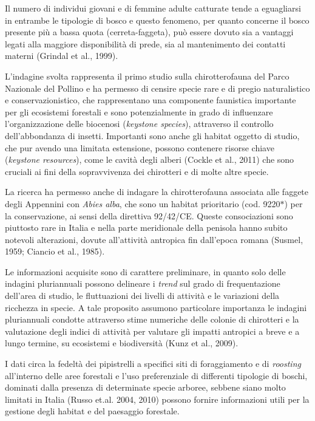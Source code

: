 \begin{multicols}{2}
Il numero di individui giovani e di femmine adulte catturate tende a eguagliarsi in entrambe le tipologie di bosco e questo fenomeno, per quanto concerne il bosco presente più a bassa quota (cerreta-faggeta), può essere dovuto sia a vantaggi legati alla maggiore disponibilità di prede, sia al mantenimento dei contatti materni (Grindal et al., 1999).

L’indagine svolta rappresenta il primo studio sulla chirotterofauna del Parco Nazionale del Pollino e ha permesso di censire specie rare e di pregio naturalistico e conservazionistico, che rappresentano una componente faunistica importante per gli ecosistemi forestali e sono potenzialmente in grado di influenzare l’organizzazione delle biocenosi (\textit{keystone species}), attraverso il controllo dell’abbondanza di insetti. Importanti sono anche gli habitat oggetto di studio, che pur avendo una limitata estensione, possono contenere risorse chiave (\textit{keystone resources}), come le cavità degli alberi (Cockle et al., 2011) che sono cruciali ai fini della sopravvivenza dei chirotteri e di molte altre specie. 

La ricerca ha permesso anche di indagare la chirotterofauna associata alle faggete degli Appennini con \emph{Abies alba}, che sono un habitat prioritario (cod. 9220$\ast$) per la conservazione, ai sensi della direttiva 92/42/CE. Queste consociazioni sono piuttosto rare in Italia e nella parte meridionale della penisola hanno subito notevoli alterazioni, dovute all’attività antropica fin dall’epoca romana (Susmel, 1959; Ciancio et al., 1985).    

Le informazioni acquisite sono di carattere preliminare, in quanto solo delle indagini pluriannuali possono delineare i \textit{trend} sul grado di frequentazione dell’area di studio, le fluttuazioni dei livelli di attività e le variazioni della ricchezza in specie. A tale proposito assumono particolare importanza le indagini pluriannuali condotte attraverso stime numeriche delle colonie di chirotteri e la valutazione degli indici di attività per valutare gli impatti antropici a breve e a lungo termine, su ecosistemi e biodiversità (Kunz et al., 2009).

I dati circa la fedeltà dei pipistrelli a specifici siti di foraggiamento e di \textit{roosting} all’interno delle aree forestali e l’uso preferenziale di differenti tipologie di boschi, dominati dalla presenza di determinate specie arboree, sebbene siano molto limitati in Italia (Russo et.al. 2004, 2010) possono fornire informazioni utili per la gestione degli habitat e del paesaggio forestale.


\end{multicols}
